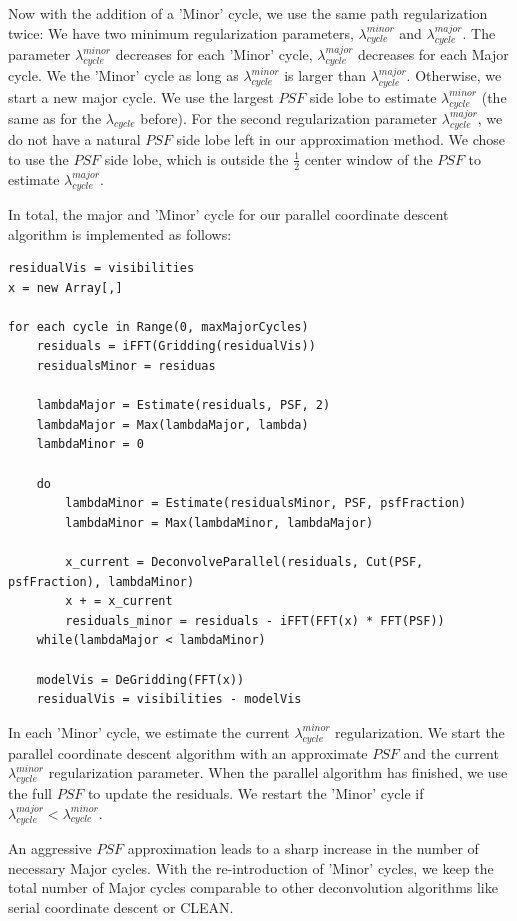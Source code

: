 Now with the addition of a 'Minor' cycle, we use the same path regularization twice: We have two minimum regularization parameters, $\lambda^{minor}_{cycle}$ and $\lambda^{major}_{cycle}$. The parameter $\lambda^{minor}_{cycle}$ decreases for each 'Minor' cycle, $\lambda^{major}_{cycle}$ decreases for each Major cycle. We  the 'Minor' cycle as long as $\lambda^{minor}_{cycle}$ is larger than $\lambda^{major}_{cycle}$. Otherwise, we start a new major cycle. We use the largest $PSF$ side lobe to estimate $\lambda^{minor}_{cycle}$ (the same as for the $\lambda_{cycle}$ before). For the second regularization parameter $\lambda^{major}_{cycle}$, we do not have a natural $PSF$ side lobe left in our approximation method. We chose to use the $PSF$ side lobe, which is outside the $\frac{1}{2}$ center window of the $PSF$ to estimate $\lambda^{major}_{cycle}$. 

In total, the major and 'Minor' cycle for our parallel coordinate descent algorithm is implemented as follows:
\begin{lstlisting}
residualVis = visibilities
x = new Array[,]

for each cycle in Range(0, maxMajorCycles)
	residuals = iFFT(Gridding(residualVis))
	residualsMinor = residuas
	
	lambdaMajor = Estimate(residuals, PSF, 2)
	lambdaMajor = Max(lambdaMajor, lambda)
	lambdaMinor = 0
	
	do
		lambdaMinor = Estimate(residualsMinor, PSF, psfFraction)
		lambdaMinor = Max(lambdaMinor, lambdaMajor)
		
		x_current = DeconvolveParallel(residuals, Cut(PSF, psfFraction), lambdaMinor)
		x + = x_current
		residuals_minor = residuals - iFFT(FFT(x) * FFT(PSF))
	while(lambdaMajor < lambdaMinor)
	
	modelVis = DeGridding(FFT(x))
	residualVis = visibilities - modelVis
\end{lstlisting}

In each 'Minor' cycle, we estimate the current $\lambda^{minor}_{cycle}$ regularization. We start the parallel coordinate descent algorithm with an approximate $PSF$ and the current $\lambda^{minor}_{cycle}$ regularization parameter. When the parallel algorithm has finished, we use the full $PSF$ to update the residuals. We restart the 'Minor' cycle if  $\lambda^{major}_{cycle} < \lambda^{minor}_{cycle}$.

An aggressive $PSF$ approximation leads to a sharp increase in the number of necessary Major cycles. With the re-introduction of 'Minor' cycles, we keep the total number of Major cycles comparable to other deconvolution algorithms like serial coordinate descent or CLEAN.

